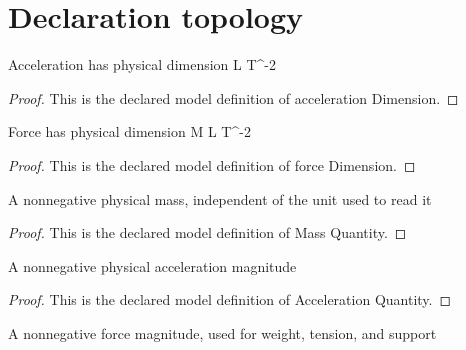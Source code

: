 \section{Declaration topology}
\begin{definition}
  \label{def:physics:phyx-mini-0758:phyxminiproblems-problemphyxmini0758-accelerationdimension}
  Acceleration has physical dimension L T\textasciicircum{}-2
\end{definition}
\begin{proof}
  This is the declared model definition of acceleration Dimension.
\end{proof}
\begin{definition}
  \label{def:physics:phyx-mini-0758:phyxminiproblems-problemphyxmini0758-forcedimension}
  Force has physical dimension M L T\textasciicircum{}-2
\end{definition}
\begin{proof}
  This is the declared model definition of force Dimension.
\end{proof}
\begin{definition}
  \label{def:physics:phyx-mini-0758:phyxminiproblems-problemphyxmini0758-massquantity}
  A nonnegative physical mass, independent of the unit used to read it
\end{definition}
\begin{proof}
  This is the declared model definition of Mass Quantity.
\end{proof}
\begin{definition}
  \label{def:physics:phyx-mini-0758:phyxminiproblems-problemphyxmini0758-accelerationquantity}
  A nonnegative physical acceleration magnitude
\end{definition}
\begin{proof}
  This is the declared model definition of Acceleration Quantity.
\end{proof}
\begin{definition}
  \label{def:physics:phyx-mini-0758:phyxminiproblems-problemphyxmini0758-forcemagnitude}
  A nonnegative force magnitude, used for weight, tension, and support
\end{definition}
